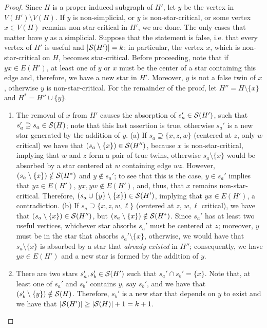 \begin{proof}
    Since $H$ is a proper induced subgraph of $H'$, let $y$ be the vertex in $V(H') \setminus V(H)$.
    If $y$ is non-simplicial, or $y$ is non-star-critical, or some vertex $x \in V(H)$ remains non-star-critical in $H'$, we are done.
    The only cases that matter have $y$ as a simplicial.
    Suppose that the statement is false, i.e. that every vertex of $H'$ is useful and $|\mathcal{S}(H')| = k$; in particular, the vertex $x$, which is non-star-critical on $H$, becomes  star-critical.
    Before proceeding, note that if $yx \in E(H')$, at least one of $y$ or $x$ must be the center of a star containing this edge and, therefore, we have a new star in $H'$.
    Moreover, $y$ is not a false twin of $x$, otherwise $y$ is non-star-critical.
    For the remainder of the proof, let $H'' = H \setminus \{x\}$ and $H^* = H'' \cup \{y\}$.
    \begin{enumerate}
        \item The removal of $x$ from $H'$ causes the absorption of $s_a' \in \mathcal{S}(H')$, such that $s_a' \supseteq s_a \in \mathcal{S}(H)$; note that this last assertion is true, otherwise $s_a'$ is a new star generated by the addition of $y$.
            \subitem(a) If $s_a \supseteq \{x, z, w\}$ (centered at $z$, only $w$ critical) we have that $(s_a \setminus \{x\}) \in \mathcal{S}(H'')$, because $x$ is non-star-critical, implying that $w$ and $z$ form a pair of true twins, otherwise $s_a \setminus \{x\}$ would be absorbed by a star centered at $w$ containing edge $wz$.
            However, $(s_a \setminus \{x\}) \notin \mathcal{S}(H^*)$ and $y \notin s_a'$; to see that this is the case, $y \in s_a'$ implies that $yz \in E(H')$, $yx,yw \notin E(H')$, and, thus, that $x$ remains non-star-critical.
            Therefore, $(s_a \cup \{y\} \setminus \{x\}) \in \mathcal{S}(H')$, implying that $yx \in E(H')$, a contradiction.
            \subitem(b) If $s_a \supseteq \{x,z,w,\ell\}$ (centered at $z$, $w,\ell$ critical), we have that $(s_a \setminus \{x\}) \in \mathcal{S}(H'')$, but $(s_a \setminus \{x\}) \notin \mathcal{S}(H^*)$.
            Since $s_a'$ has at least two useful vertices, whichever star absorbs $s_a'$ must be centered at $z$; moreover, $y$ must be in the star that absorbs $s_a' \setminus \{x\}$, otherwise, we would have that $s_a \setminus \{x\}$ is absorbed by a star that \textit{already existed} in $H''$; consequently, we have $yx \in E(H')$ and a new star is formed by the addition of $y$.
        \item There are two stars $s_a', s_b' \in \mathcal{S}(H')$ such that $s_a' \cap s_b' = \{x\}$.
        Note that, at least one of $s_a'$ and $s_b'$ contains $y$, say $s_b'$, and we have that $(s_b' \setminus \{y\}) \notin \mathcal{S}(H)$.
        Therefore, $s_b'$ is a new star that depends on $y$ to exist and we have that $|\mathcal{S}(H')| \geq |\mathcal{S}(H)| + 1 = k + 1$.
    \end{enumerate}
\end{proof}

